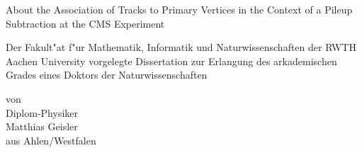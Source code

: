 \begin{titlepage}

\begin{center}
\vspace*{7.5cm}
\textrm{\LARGE About the Association of Tracks to Primary Vertices in the Context of a Pileup Subtraction at the CMS Experiment}
\\[1.5cm]
\end{center}

\textsf{\large Der Fakult"at f"ur Mathematik, Informatik und Naturwissenschaften der RWTH Aachen University vorgelegte Dissertation zur Erlangung des arkademischen Grades eines Doktors der Naturwissenschaften}\\[0.5cm]


\begin{center}
\textsf{\large von}\\[0.8cm]
\textsf{\large Diplom-Physiker}\\[0.8cm]
\textsf{\large Matthias Geisler}\\[0.8cm]
\textsf{\large aus Ahlen/Westfalen}\\[0.8cm]
\end{center}

\vfill

\end{titlepage}